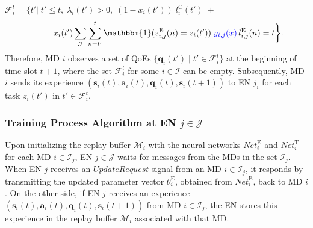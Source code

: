 \documentclass[10pt, journal,letterpaper]{IEEEtran}
\begin{document}
$\mathcal{F}_i^t =\bigg \{ t' \bigg|\; t' \leq t,\; \lambda_i(t')>0, \; (1 - x_i(t')) \; l_i^{\text{C}}(t') \; + $ \vspace{-3mm}
\begin{equation}
	\hspace{10mm} x_i(t')\sum\limits_{\mathcal{J}} \sum\limits_{n= t'}^{t}\mathbbm{1}(z_{i,j}^{\text{E}}(n)=z_i(t'))  \; \textcolor{blue}{y_{i,j}(x)} \, l_{i,j}^{\text{E}}(n) = t \bigg\}.
	\label{27}  
	\nonumber
\end{equation}
Therefore, MD $i$ observes a set of QoEs $\{\boldsymbol{q}_i(t') \mid t' \in \mathcal{F}_i^t\}$ at the beginning of time slot $t+1$, where the set $\mathcal{F}_i^t$ for some $i \in \mathcal{I}$ can be empty. Subsequently, MD $i$ sends its experience $(\boldsymbol{s}_i(t), \boldsymbol{a}_i(t), \boldsymbol{q}_i(t), \boldsymbol{s}_i(t+1))$ to EN $j_i$ for each task $z_i(t')$ in $t' \in \mathcal{F}_i^t$.





\subsubsection{Training Process Algorithm at EN $j \in \mathcal{J}$}
Upon initializing the replay buffer $\mathcal{M}_i$ with the neural networks $\textit{Net}_i^{\text{E}}$ and $\textit{Net}_i^{\text{T}}$ for each MD $i \in \mathcal{I}_j$, EN $j \in \mathcal{J}$ waits for messages from the MDs in the set $\mathcal{I}_j$. When EN $j$ receives an $\textit{UpdateRequest}$ signal from an MD $i \in \mathcal{I}_j$, it responds by transmitting the updated parameter vector $\theta^{\text{E}}_i$, obtained from $\textit{Net}_i^{\text{E}}$, back to MD $i$. On the other side, if EN $j$ receives an experience $(\boldsymbol{s}_i(t), \boldsymbol{a}_i(t), \boldsymbol{q}_i(t), \boldsymbol{s}_i(t+1))$ from MD $i \in \mathcal{I}_j$, the EN stores this experience in the replay buffer $\mathcal{M}_i$ associated with that MD. %
\end{document}
